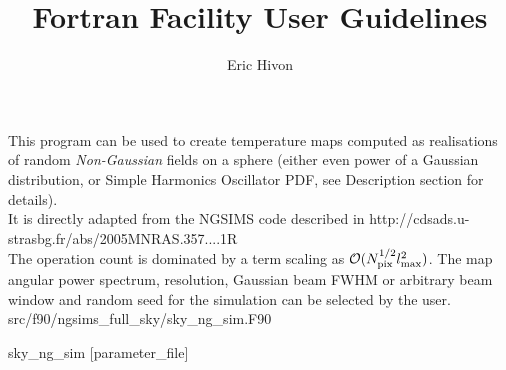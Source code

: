 
\sloppy


\title{\healpix Fortran Facility User Guidelines}
 \section[sky\_ng\_sim]{\nosectionname}
\label{fac:sky_ng_sim}
\author{Eric Hivon}

\begin{facility}
{This program can be used to create temperature \healpix maps computed as realisations 
of random {\em Non-Gaussian} fields on a sphere (either even power of a Gaussian
distribution, or Simple Harmonics Oscillator PDF, see Description section for
details). \\
It is directly adapted from the NGSIMS code described in 
%
{http://cdsads.u-strasbg.fr/abs/2005MNRAS.357....1R}%
\\
The operation count is dominated by a term scaling as
 ${\cal {O}}(N_{\rm pix}^{1/2} \ell_{\rm max}^2)$. 
The map angular power spectrum, resolution, Gaussian beam FWHM or arbitrary beam window  
and random seed for the simulation can be selected by the user.
}
{src/f90/ngsims\_full\_sky/sky\_ng\_sim.F90}
\end{facility}

\begin{f90facility}
{sky\_ng\_sim [parameter\_file]}
\end{f90facility}


